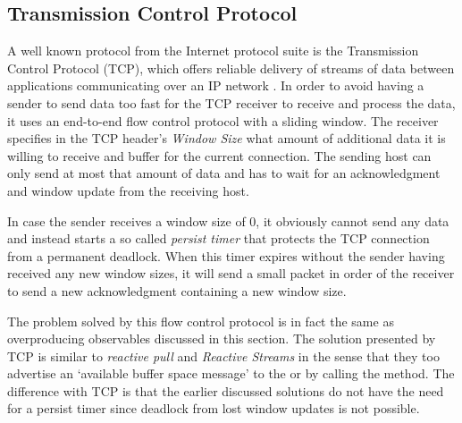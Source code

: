 \subsection{Transmission Control Protocol}
\label{subsec:tcp}
A well known protocol from the Internet protocol suite is the Transmission Control Protocol (TCP), which offers reliable delivery of streams of data between applications communicating over an IP network \cite{tanenbaum2011-Computer-Networks}. In order to avoid having a sender to send data too fast for the TCP receiver to receive and process the data, it uses an end-to-end flow control protocol with a sliding window. The receiver specifies in the TCP header's \textit{Window Size} what amount of additional data it is willing to receive and buffer for the current connection. The sending host can only send at most that amount of data and has to wait for an acknowledgment and window update from the receiving host.

In case the sender receives a window size of 0, it obviously cannot send any data and instead starts a so called \textit{persist timer} that protects the TCP connection from a permanent deadlock. When this timer expires without the sender having received any new window sizes, it will send a small packet in order of the receiver to send a new acknowledgment containing a new window size.

The problem solved by this flow control protocol is in fact the same as overproducing observables discussed in this section. The solution presented by TCP is similar to \textit{reactive pull} and \textit{Reactive Streams} in the sense that they too advertise an `available buffer space message' to the  or \obs by calling the  method. The difference with TCP is that the earlier discussed solutions do not have the need for a persist timer since deadlock from lost window updates is not possible.










































